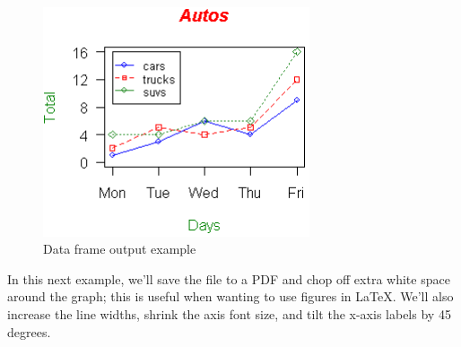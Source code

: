 \documentclass[10pt]{book}
\begin{document}
\begin{figure}[H]
    \begin{flushleft}
        \includegraphics[width=0.7\textwidth]{line_script5.png}
        \caption{Data frame output example}
        \label{fig:dataframe}
    \end{flushleft}
\end{figure}

In this next example, we'll save the file to a PDF and chop off extra white space around the graph; this is useful when wanting to use figures in LaTeX. We'll also increase the line widths, shrink the axis font size, and tilt the x-axis labels by 45 degrees.
\end{document}
